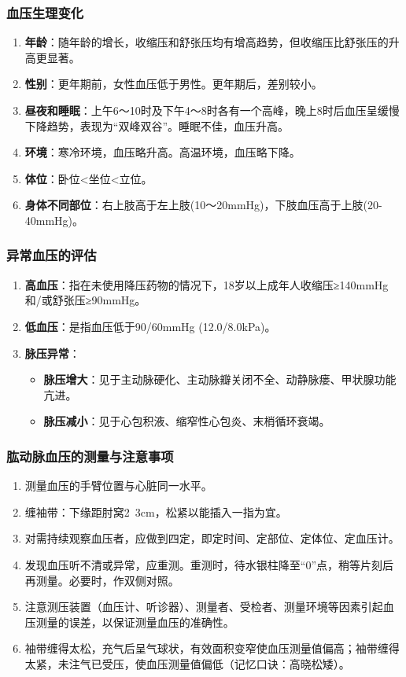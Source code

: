 \documentclass[11pt, a4paper]{ctexart}
\begin{document}
\subsubsection{血压生理变化}
\begin{enumerate}
    \item \textbf{年龄}：随年龄的增长，收缩压和舒张压均有增高趋势，但收缩压比舒张压的升高更显著。
    \item \textbf{性别}：更年期前，女性血压低于男性。更年期后，差别较小。
    \item \textbf{昼夜和睡眠}：上午6～10时及下午4～8时各有一个高峰，晚上8时后血压呈缓慢下降趋势，表现为“双峰双谷”。睡眠不佳，血压升高。
    \item \textbf{环境}：寒冷环境，血压略升高。高温环境，血压略下降。
    \item \textbf{体位}：卧位<坐位<立位。
    \item \textbf{身体不同部位}：右上肢高于左上肢(10～20mmHg)，下肢血压高于上肢(20-40mmHg)。
\end{enumerate}

\subsubsection{异常血压的评估}
\begin{enumerate}
    \item \textbf{高血压}：指在未使用降压药物的情况下，18岁以上成年人收缩压≥140mmHg和/或舒张压≥90mmHg。
    \item \textbf{低血压}：是指血压低于90/60mmHg (12.0/8.0kPa)。
    \item \textbf{脉压异常}：
    \begin{itemize}
        \item \textbf{脉压增大}：见于主动脉硬化、主动脉瓣关闭不全、动静脉瘘、甲状腺功能亢进。
        \item \textbf{脉压减小}：见于心包积液、缩窄性心包炎、末梢循环衰竭。
    \end{itemize}
\end{enumerate}

\subsubsection{肱动脉血压的测量与注意事项}
\begin{enumerate}
    \item 测量血压的手臂位置与心脏同一水平。
    \item 缠袖带：下缘距肘窝2~3cm，松紧以能插入一指为宜。
    \item 对需持续观察血压者，应做到四定，即定时间、定部位、定体位、定血压计。
    \item 发现血压听不清或异常，应重测。重测时，待水银柱降至“0”点，稍等片刻后再测量。必要时，作双侧对照。
    \item 注意测压装置（血压计、听诊器）、测量者、受检者、测量环境等因素引起血压测量的误差，以保证测量血压的准确性。
    \item 袖带缠得太松，充气后呈气球状，有效面积变窄使血压测量值偏高；袖带缠得太紧，未注气已受压，使血压测量值偏低（记忆口诀：高晓松矮）。
\end{enumerate}
\end{document}
